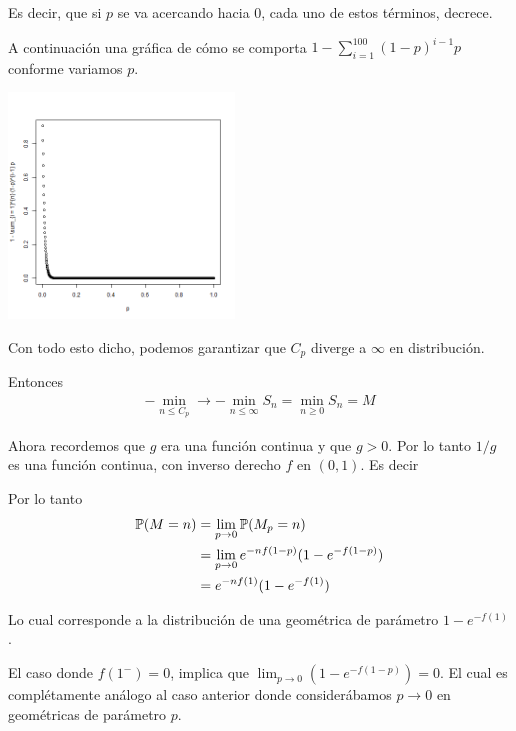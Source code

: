 Es decir, que si $p$ se va acercando hacia 0, cada uno de estos términos, decrece.\par\null

A continuación una gráfica de cómo se comporta $1 - \sum_{i = 1}^{100} (1-p)^{i-1}p$ conforme variamos $p$.\par\null

\begin{center}
    \includegraphics[width=6cm]{tarea2/problema2_1/graficas_inciso2_1_4/probabilidadDeQueC_pSupere100.png}
\end{center}\par\null

Con todo esto dicho, podemos garantizar que $C_p$ diverge a $\infty$ en distribución.\par\null

Entonces 
\begin{align}
    - \min_{n \leq C_p} \rightarrow - \min_{n \leq \infty} S_n = \min_{n \geq 0} S_n = M
\end{align}\par\null

Ahora recordemos que $g$ era una función continua y que $g>0$. Por lo tanto $1/g$ es una función continua,
con inverso derecho $f$ en $(0, 1)$. Es decir

Por lo tanto
\begin{align}
    \mathbb{P}(M = n)  &=  \lim_{p \rightarrow 0} \mathbb{P}(M_p = n)                         \\
                &=  \lim_{p \rightarrow 0} e^{-n f(1-p)}(1-e^{- f(1-p)})        \\
                &=   e^{-n f(1)}(1-e^{- f(1)}) \label{problema2_1:distribucion_de_M}
\end{align}

Lo cual corresponde a la distribución de una geométrica de parámetro $1-e^{- f(1)}$.\par\null

El caso donde $f(1^-) = 0$, implica que $\lim_{p\rightarrow0} (1-e^{- f(1-p)}) = 0$. El cual es complétamente
análogo al caso anterior donde considerábamos $p \rightarrow 0$ en geométricas de parámetro $p$.\par\null

